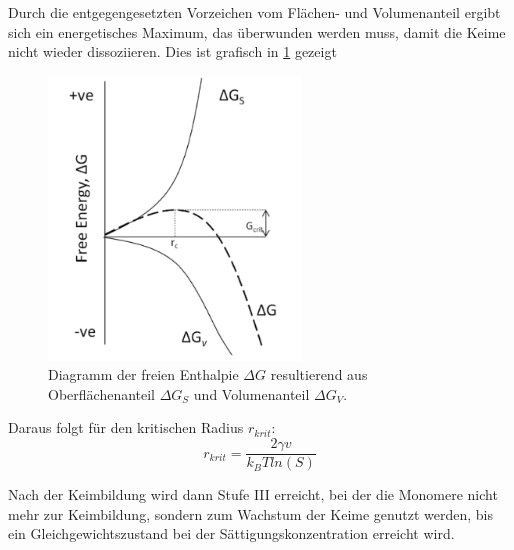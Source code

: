 	Durch die entgegengesetzten Vorzeichen vom Flächen- und Volumenanteil ergibt sich ein energetisches Maximum, das überwunden werden muss, damit die Keime nicht wieder dissoziieren.
	Dies ist grafisch in \cref{fig:Keimbildung} gezeigt 
	
	\begin{figure}[H]
		\centering
		\includegraphics[width=0.6\textwidth]{Bilder/Keimbildung} 	
		\caption{Diagramm der freien Enthalpie  $\Delta G$ resultierend aus Oberflächenanteil  $\Delta G_S$ und Volumenanteil  $\Delta G_V$.\autocite{Thanh2014}}
		\label{fig:Keimbildung}
	\end{figure}
	Daraus folgt für den kritischen Radius $r_{krit}$:
	\begin{equation}
	r_{krit}=\dfrac{2 \gamma v}{k_B T ln(S)}
	\end{equation}
	
	Nach der Keimbildung wird dann Stufe III erreicht, bei der die Monomere nicht mehr zur Keimbildung, sondern zum Wachstum der Keime genutzt werden, bis ein Gleichgewichtszustand bei der Sättigungskonzentration erreicht wird.
	
	
